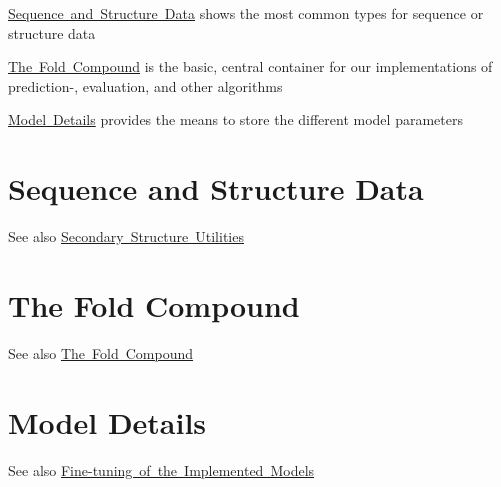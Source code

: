 
\begin{DoxyItemize}
\item \mbox{\hyperlink{sequence_structure_data}{Sequence and Structure Data}} shows the most common types for sequence or structure data
\item \mbox{\hyperlink{fold_compound_container}{The \textquotesingle{}Fold Compound\textquotesingle{}}} is the basic, central container for our implementations of prediction-\/, evaluation, and other algorithms
\item \mbox{\hyperlink{model_settings}{Model Details}} provides the means to store the different model parameters 
\end{DoxyItemize}\hypertarget{sequence_structure_data}{}\section{Sequence and Structure Data}\label{sequence_structure_data}
\begin{DoxySeeAlso}{See also}
\mbox{\hyperlink{group__struct__utils}{Secondary Structure Utilities}} 
\end{DoxySeeAlso}
\hypertarget{fold_compound_container}{}\section{The \textquotesingle{}Fold Compound\textquotesingle{}}\label{fold_compound_container}
\begin{DoxySeeAlso}{See also}
\mbox{\hyperlink{group__fold__compound}{The Fold Compound}} 
\end{DoxySeeAlso}
\hypertarget{model_settings}{}\section{Model Details}\label{model_settings}
\begin{DoxySeeAlso}{See also}
\mbox{\hyperlink{group__model__details}{Fine-\/tuning of the Implemented Models}} 
\end{DoxySeeAlso}
